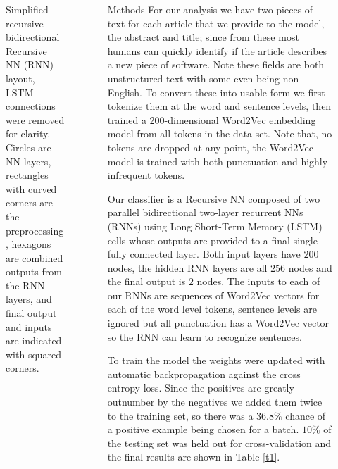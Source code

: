 \documentclass[final]{beamer}
\newlength{\sepwid}
\newlength{\onecolwid}
\begin{document}
\begin{frame}{}
\begin{columns}[t]
\begin{column}{\onecolwid}
\begin{block}{}
\begin{figure}[!ht]
			\caption{Simplified recursive bidirectional Recursive NN (RNN) layout, LSTM connections were removed for clarity. Circles are NN layers, rectangles with curved corners are the preprocessing, hexagons are combined outputs from the RNN layers, and final output and inputs are indicated with squared corners.}\label{rnn}
		\end{figure}
	\end{block}

	\end{column} 


\begin{column}{\onecolwid} %
	\begin{alertblock}{Methods}
		\justifying
		For our analysis we have two pieces of text for each article that we provide to the model, the abstract and title; since from these most humans can quickly identify if the article describes a new piece of software. Note these fields are both unstructured text with some even being non-English. To convert these into usable form we first tokenize them at the word and sentence levels, then trained a 200-dimensional Word2Vec embedding model from all tokens in the data set. Note that, no tokens are dropped at any point, the Word2Vec model is trained with both punctuation and highly infrequent tokens.
		
		Our classifier is a Recursive NN composed of two parallel bidirectional two-layer recurrent NNs (RNNs) using Long Short-Term Memory (LSTM) cells whose outputs are provided to a final single fully connected layer. Both input layers have $200$ nodes, the hidden RNN layers are all $256$ nodes and the final output is $2$ nodes. The inputs to each of our RNNs are sequences of Word2Vec vectors for each of the word level tokens, sentence levels are ignored but all punctuation has a Word2Vec vector so the RNN can learn to recognize sentences.
		
		To train the model the weights were updated with automatic backpropagation against the cross entropy loss. Since the positives are greatly outnumber by the negatives we added them twice to the training set, so there was a $36.8\%$ chance of a positive example being chosen for a batch. $10\%$ of the testing set was held out for cross-validation and the final results are shown in Table \ref{t1}.
		

\end{alertblock}
\end{column}
\end{columns}
\end{frame}
\end{document}

